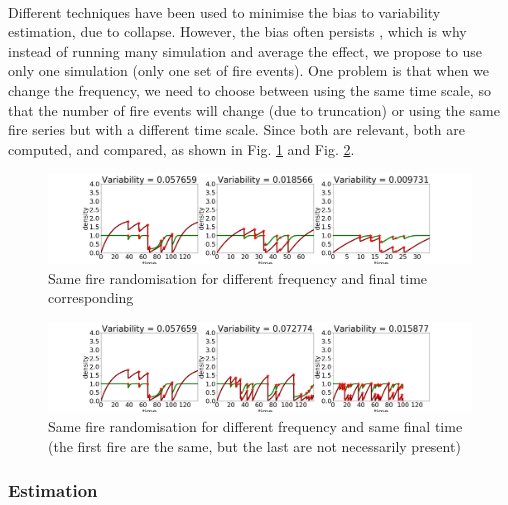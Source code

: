 \documentclass{article}
\begin{document}
\paragraph{}
Different techniques have been used to minimise the bias to variability estimation, due to collapse. However, the bias often persists \citep{seely2004complex}, which is why instead of running many simulation and average the effect, we propose to use only one simulation (only one set of fire events). One problem is that when we change the frequency, we need to choose between using the same time scale, so that the number of fire events will change (due to truncation) or using the same fire series but with a different time scale. Since both are relevant, both are computed, and compared, as shown in Fig. \ref{fig:same2} and Fig. \ref{fig:same1}.


\begin{figure}[h!]
\centering
\includegraphics[width=12.cm]{same_2.png}
\caption{Same fire randomisation for different frequency and final time corresponding
\label{fig:same2}
}
\end{figure}

\begin{figure}[h!]
\centering
\includegraphics[width=12.cm]{same_1.png}
\caption{Same fire randomisation for different frequency and same final time (the first fire are the same, but the last are not necessarily present)
\label{fig:same1}
}
\end{figure}


\newpage
\subsubsection{Estimation}
\label{estimation}
\end{document}
